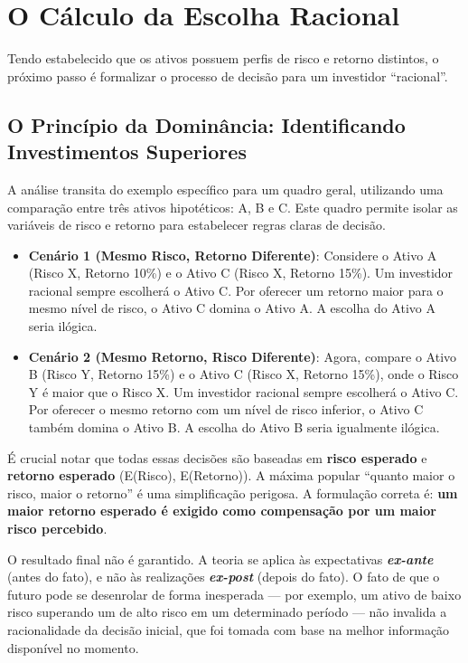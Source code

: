 \documentclass[
  a4paper,
]{book}
\begin{document}
\section{O Cálculo da Escolha
Racional}\label{o-cuxe1lculo-da-escolha-racional}

Tendo estabelecido que os ativos possuem perfis de risco e retorno
distintos, o próximo passo é formalizar o processo de decisão para um
investidor ``racional''.

\subsection{O Princípio da Dominância: Identificando Investimentos
Superiores}\label{o-princuxedpio-da-dominuxe2ncia-identificando-investimentos-superiores}

A análise transita do exemplo específico para um quadro geral,
utilizando uma comparação entre três ativos hipotéticos: A, B e C. Este
quadro permite isolar as variáveis de risco e retorno para estabelecer
regras claras de decisão.

\begin{itemize}
\item
  \textbf{Cenário 1 (Mesmo Risco, Retorno Diferente)}: Considere o Ativo
  A (Risco X, Retorno 10\%) e o Ativo C (Risco X, Retorno 15\%). Um
  investidor racional sempre escolherá o Ativo C. Por oferecer um
  retorno maior para o mesmo nível de risco, o Ativo C domina o Ativo A.
  A escolha do Ativo A seria ilógica.
\item
  \textbf{Cenário 2 (Mesmo Retorno, Risco Diferente)}: Agora, compare o
  Ativo B (Risco Y, Retorno 15\%) e o Ativo C (Risco X, Retorno 15\%),
  onde o Risco Y é maior que o Risco X. Um investidor racional sempre
  escolherá o Ativo C. Por oferecer o mesmo retorno com um nível de
  risco inferior, o Ativo C também domina o Ativo B. A escolha do Ativo
  B seria igualmente ilógica.
\end{itemize}

É crucial notar que todas essas decisões são baseadas em \textbf{risco
esperado} e \textbf{retorno esperado} (E(Risco), E(Retorno)). A máxima
popular ``quanto maior o risco, maior o retorno'' é uma simplificação
perigosa. A formulação correta é: \textbf{um maior retorno esperado é
exigido como compensação por um maior risco percebido}.

O resultado final não é garantido. A teoria se aplica às expectativas
\textbf{\emph{ex-ante}} (antes do fato), e não às realizações
\textbf{\emph{ex-post}} (depois do fato). O fato de que o futuro pode se
desenrolar de forma inesperada --- por exemplo, um ativo de baixo risco
superando um de alto risco em um determinado período --- não invalida a
racionalidade da decisão inicial, que foi tomada com base na melhor
informação disponível no momento.
\end{document}
